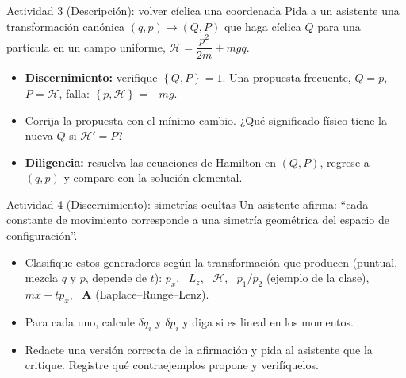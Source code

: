 \documentclass[spanish]{beamer}
\newcommand{\Ham}{\mathcal{H}}
\newcommand{\pb}[2]{\left\{#1,#2\right\}}   %
\begin{document}
\begin{frame}{Actividad 3 (Descripción): volver cíclica una coordenada}
Pida a un asistente una transformación canónica $(q,p)\to(Q,P)$ que haga cíclica
$Q$ para una partícula en un campo uniforme,
$\Ham = \dfrac{p^2}{2m} + mgq$.
\begin{itemize}
  \item<2-> \textbf{Discernimiento:} verifique $\pb{Q}{P} = 1$. Una propuesta frecuente,
        $Q = p$, $P = \Ham$, falla: $\pb{p}{\Ham} = -mg$.
  \item<3-> Corrija la propuesta con el mínimo cambio. ¿Qué significado físico tiene
        la nueva $Q$ si $\Ham' = P$?
  \item<4-> \textbf{Diligencia:} resuelva las ecuaciones de Hamilton en $(Q,P)$, regrese a
        $(q,p)$ y compare con la solución elemental.
\end{itemize}
\end{frame}

\begin{frame}{Actividad 4 (Discernimiento): simetrías ocultas}
Un asistente afirma: ``cada constante de movimiento corresponde a una simetría
geométrica del espacio de configuración''.
\begin{itemize}
  \item<2-> Clasifique estos generadores según la transformación que producen
        (puntual, mezcla $q$ y $p$, depende de $t$):
        $p_x$, \ $L_z$, \ $\Ham$, \ $p_1/p_2$ (ejemplo de la clase),
        \ $mx - tp_x$, \ $\mathbf A$ (Laplace--Runge--Lenz).
  \item<3-> Para cada uno, calcule $\delta q_i$ y $\delta p_i$ y diga si es lineal en los
        momentos.
  \item<4-> Redacte una versión correcta de la afirmación y pida al asistente que la
        critique. Registre qué contraejemplos propone y verifíquelos.
\end{itemize}
\end{frame}
\end{document}
